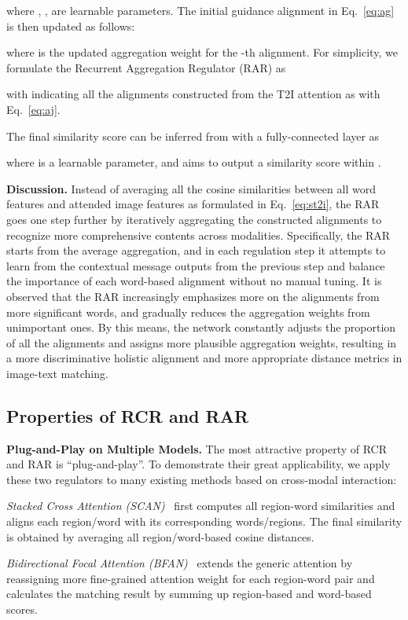 \documentclass[journal]{IEEEtran}\newcommand{\ignore}[1]{}
\begin{document}
where , ,  are learnable parameters. The initial guidance alignment  in Eq.~\eqref{eq:ag} is then updated as follows:

where  is the updated aggregation weight for the -th alignment.
For simplicity, we formulate the Recurrent Aggregation Regulator (RAR) as 

with  indicating all the alignments constructed from the T2I attention as with Eq.~\eqref{eq:aj}.

The final similarity score can be inferred from  with a fully-connected layer as

where  is a learnable parameter, and  aims to output a similarity score within .

{\bf Discussion.} Instead of averaging all the cosine similarities between all word features and attended image features as formulated in Eq.~\eqref{eq:st2i}, the RAR goes one step further by iteratively aggregating the constructed alignments to recognize more comprehensive contents across modalities. Specifically, the RAR starts from the average aggregation, and in each regulation step it attempts to learn from the contextual message outputs from the previous step and balance the importance of each word-based alignment without no manual tuning. It is observed that the RAR increasingly emphasizes more on the alignments from more significant words, and gradually reduces the aggregation weights from unimportant ones. By this means, the network constantly adjusts the proportion of all the alignments and assigns more plausible aggregation weights, resulting in a more discriminative holistic alignment and more appropriate distance metrics in image-text matching.

\subsection{Properties of RCR and RAR}
{\bf Plug-and-Play on Multiple Models.} The most attractive property of RCR and RAR is “plug-and-play”. To demonstrate their great applicability, we apply these two regulators to many existing methods based on cross-modal interaction:

\textit{Stacked Cross Attention
(SCAN)}~\cite{SCAN} first computes all region-word similarities and aligns each region/word with its corresponding words/regions. The final similarity is obtained by averaging all region/word-based cosine distances.

\textit{Bidirectional Focal Attention (BFAN)}~\cite{BFAN} extends the generic attention by reassigning more fine-grained attention weight for each region-word pair and calculates the matching result by summing up region-based and word-based scores.
\end{document}
